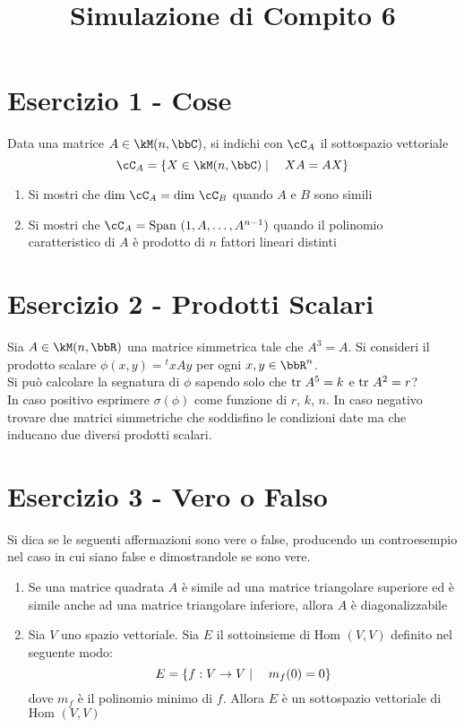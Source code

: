 \documentclass[a4paper,NoNotes,GeneralMath]{stdmdoc}
\begin{document}
	\newpage
	\title{Simulazione di Compito 6}
	\section*{Esercizio 1 - Cose}
	Data una matrice $A \in \kM(n,\bbC)$, si indichi con $\cC_A$ il sottospazio vettoriale $$ \cC_A = \{X \in \kM(n,\bbC) \mid \quad XA = AX \} $$
	\begin{enumerate}
		\item Si mostri che $\Dim \cC_A = \Dim \cC_B$ quando $A$ e $B$ sono simili
		\item Si mostri che $\cC_A = \Span(1, A, \ldots, A^{n-1})$ quando il polinomio caratteristico di $A$ è prodotto di $n$ fattori lineari distinti
	\end{enumerate}

	\section*{Esercizio 2 - Prodotti Scalari}
	Sia $A \in \kM(n, \bbR)$ una matrice simmetrica tale che $A^3 = A$. Si consideri il prodotto scalare $\phi(x,y) = {}^txAy$ per ogni $x, y\in \bbR^n$. \\ Si può calcolare la segnatura di $\phi$ sapendo solo che $\mbox{tr } A^5 = k$ e $\mbox{tr } A^2 = r$? \\ In caso positivo esprimere $\sigma(\phi)$ come funzione di $r$, $k$, $n$. In caso negativo trovare due matrici simmetriche che soddisfino le condizioni date ma che inducano due diversi prodotti scalari.

	\section*{Esercizio 3 - Vero o Falso}
	Si dica se le seguenti affermazioni sono vere o false, producendo un controesempio nel caso in cui siano false e dimostrandole se sono vere.
	\begin{enumerate}
		\item Se una matrice quadrata $A$ è simile ad una matrice triangolare superiore ed è simile anche ad una matrice triangolare inferiore, allora $A$ è diagonalizzabile
		\item Sia $V$ uno spazio vettoriale. Sia $E$ il sottoinsieme di $\text{Hom }(V,V)$ definito nel seguente modo: $$ E=\{f:V\rightarrow V \mid \quad m_f(0) = 0\}$$ dove $m_f$ è il polinomio minimo di $f$. Allora $E$ è un sottospazio vettoriale di $\text{Hom }(V,V)$
	\end{enumerate}
\end{document}
